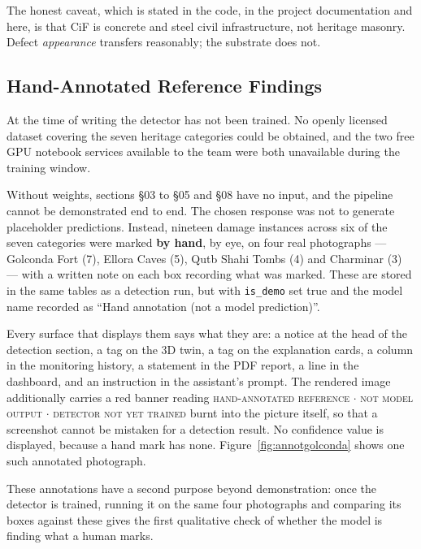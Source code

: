 \documentclass[a4paper,12pt,oneside]{book}
\begin{document}
The honest caveat, which is stated in the code, in the project documentation and here, is that CiF is concrete and steel civil infrastructure, not heritage masonry. Defect \textit{appearance} transfers reasonably; the substrate does not.

\subsection{Hand-Annotated Reference Findings}
At the time of writing the detector has not been trained. No openly licensed dataset covering the seven heritage categories could be obtained, and the two free GPU notebook services available to the team were both unavailable during the training window.

Without weights, sections \S03 to \S05 and \S08 have no input, and the pipeline cannot be demonstrated end to end. The chosen response was not to generate placeholder predictions. Instead, nineteen damage instances across six of the seven categories were marked \textbf{by hand}, by eye, on four real photographs --- Golconda Fort (7), Ellora Caves (5), Qutb Shahi Tombs (4) and Charminar (3) --- with a written note on each box recording what was marked. These are stored in the same tables as a detection run, but with \texttt{is\_demo} set true and the model name recorded as ``Hand annotation (not a model prediction)''.

Every surface that displays them says what they are: a notice at the head of the detection section, a tag on the 3D twin, a tag on the explanation cards, a column in the monitoring history, a statement in the PDF report, a line in the dashboard, and an instruction in the assistant's prompt. The rendered image additionally carries a red banner reading \textsc{hand-annotated reference $\cdot$ not model output $\cdot$ detector not yet trained} burnt into the picture itself, so that a screenshot cannot be mistaken for a detection result. No confidence value is displayed, because a hand mark has none. Figure~\ref{fig:annotgolconda} shows one such annotated photograph.

These annotations have a second purpose beyond demonstration: once the detector is trained, running it on the same four photographs and comparing its boxes against these gives the first qualitative check of whether the model is finding what a human marks.
\end{document}
